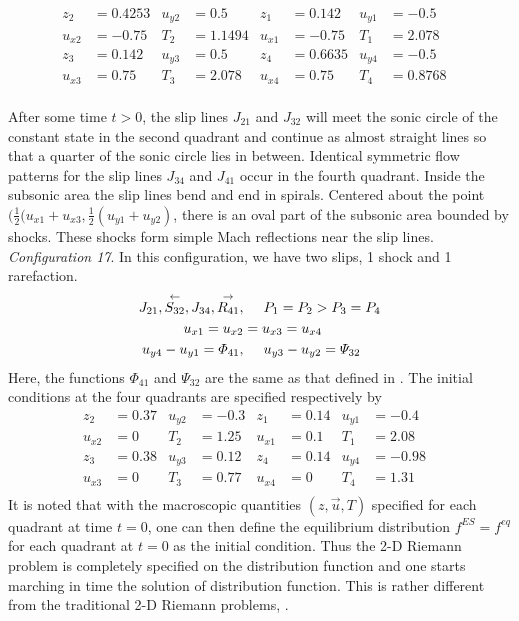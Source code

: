 \documentclass{rsproca}%
\begin{document}
\begin{align*}
z_2	&=0.4253& 	u_{y2}&=0.5& 	z_1&=0.142& 		u_{y1}&=-0.5& \\
u_{x2}&=-0.75&	T_2&=1.1494& 	u_{x1}&=-0.75& 	T_1&=2.078&		\\
z_3&=0.142&			u_{y3}&=0.5& 	z_4&=0.6635& 		u_{y4}&=-0.5&	\\
u_{x3}&=0.75&		T_3&=2.078& 	u_{x4}&=0.75& 	T_4&=0.8768&	\\
\end{align*}

After some time $t> 0$, the slip lines $J_{21}$ and $J_{32}$ will meet the sonic circle of the constant state in the second quadrant and continue as almost straight lines so that a quarter of the sonic circle lies in between.  Identical symmetric flow patterns for the slip lines $J_{34}$ and $J_{41}$ occur in the fourth quadrant. Inside the subsonic area the slip lines bend and end in spirals.  Centered about the point $(\frac{1}{2}(u_{x1} +u_{x3},\frac{1}{2}(u_{y1} +u_{y2})$, there is an oval part of the subsonic area bounded by shocks. These shocks form simple Mach reflections near the slip lines.  \\

{\em Configuration 17}.
In this configuration, we have two slips, 1 shock and 1 rarefaction.
\begin{align*}
J_{21},\stackrel{\leftarrow}{S_{32}},J_{34},\stackrel{\rightarrow}{R_{41}},&\hspace{0.2in}P_1=P_2>P_3=P_4  \\
u_{x1}=u_{x2}&=u_{x3}=u_{x4}\\
u_{y4}-u_{y1}=\Phi_{41},&\hspace{0.2in}u_{y3}-u_{y2}=\Psi_{32}
\end{align*}
Here, the functions $\Phi_{41}$ and $\Psi_{32}$ are the same as that defined in \cite{schultzrinne}.  The initial conditions at the four quadrants are specified respectively by
\begin{align*}
z_2		&=0.37& u_{y2}	&=-0.3& z_1		 	&=0.14& 	u_{y1}	&=-0.4& 	\\
u_{x2}&=0& 		T_2			&=1.25& u_{x1}	&=0.1& 		T_1			&=2.08&		\\
z_3		&=0.38& u_{y3}	&=0.12& z_4			&=0.14&		u_{y4}	&=-0.98& 	\\
u_{x3}&=0& 		T_3			&=0.77& u_{x4}	&=0& 			T_4			&=1.31&		\\
\end{align*}
It is noted that with the macroscopic quantities $(z, \vec u, T)$ specified for each quadrant at time $t=0$, one can then define the equilibrium distribution $f^{ES}=f^{eq}$ for each quadrant at $t=0$ as the initial condition.  Thus the 2-D Riemann problem is completely specified on the distribution function and one starts marching in time the solution of distribution function.  This is rather different from the traditional 2-D Riemann problems, \cite{Laxliu95}  \cite{schultzrinne}.
\end{document}
